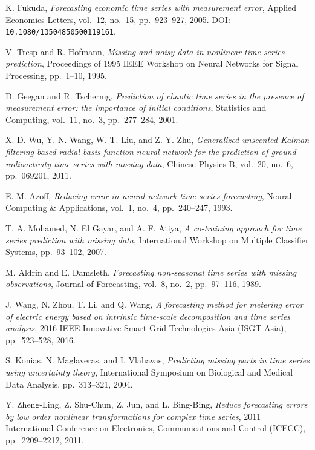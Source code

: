\begin{enumerate}[label={[S\arabic*]}]
    K. Fukuda, \textit{Forecasting economic time series with measurement error}, Applied Economics Letters, vol.~12, no.~15, pp.~923–927, 2005. DOI: \texttt{10.1080/13504850500119161}.
    \item %
    V. Tresp and R. Hofmann, \textit{Missing and noisy data in nonlinear time-series prediction}, Proceedings of 1995 IEEE Workshop on Neural Networks for Signal Processing, pp.~1–10, 1995.
    \item %
    D. Geegan and R. Tschernig, \textit{Prediction of chaotic time series in the presence of measurement error: the importance of initial conditions}, Statistics and Computing, vol.~11, no.~3, pp.~277–284, 2001.
    \item %
    X. D. Wu, Y. N. Wang, W. T. Liu, and Z. Y. Zhu, \textit{Generalized unscented Kalman filtering based radial basis function neural network for the prediction of ground radioactivity time series with missing data}, Chinese Physics B, vol.~20, no.~6, pp.~069201, 2011.
    \item %
    E. M. Azoff, \textit{Reducing error in neural network time series forecasting}, Neural Computing \& Applications, vol.~1, no.~4, pp.~240–247, 1993.
    \item %
    T. A. Mohamed, N. El Gayar, and A. F. Atiya, \textit{A co-training approach for time series prediction with missing data}, International Workshop on Multiple Classifier Systems, pp.~93–102, 2007.
    \item %
    M. Aldrin and E. Damsleth, \textit{Forecasting non-seasonal time series with missing observations}, Journal of Forecasting, vol.~8, no.~2, pp.~97–116, 1989.
    \item %
    J. Wang, N. Zhou, T. Li, and Q. Wang, \textit{A forecasting method for metering error of electric energy based on intrinsic time-scale decomposition and time series analysis}, 2016 IEEE Innovative Smart Grid Technologies-Asia (ISGT-Asia), pp.~523–528, 2016.
    \item %
    S. Konias, N. Maglaveras, and I. Vlahavas, \textit{Predicting missing parts in time series using uncertainty theory}, International Symposium on Biological and Medical Data Analysis, pp.~313–321, 2004.
    \item %
    Y. Zheng-Ling, Z. Shu-Chun, Z. Jun, and L. Bing-Bing, \textit{Reduce forecasting errors by low order nonlinear transformations for complex time series}, 2011 International Conference on Electronics, Communications and Control (ICECC), pp.~2209–2212, 2011.

\end{enumerate}
